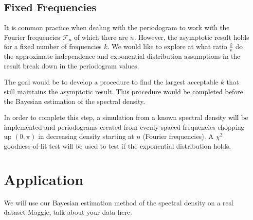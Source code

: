 \documentclass{article}\usepackage[]{graphicx}\usepackage[]{color}
\newcommand{\ak}[1]{{\color{magenta} #1}}
\newcommand{\mj}[1]{{\color{blue} #1}}
\theoremstyle{plain}
\begin{document}
\subsection*{Fixed Frequencies}
It is common practice when dealing with the periodogram to work with the Fourier frequencies $\mathcal{F}_n$ of which there are $n$. However, the asymptotic result \mj{holds for} a fixed number of frequencies $k$. We would like to explore at what ratio $\frac{k}{n}$ do the approximate independence and exponential distribution \mj{assumptions in the result} break down in the periodogram values.

The goal would be to develop a procedure to find the largest acceptable $k$ that still maintains \mj{the asymptotic result}. This procedure would be completed before the Bayesian estimation of the spectral density.

In order to complete this step, a simulation from a known spectral density will be implemented and periodograms created from evenly spaced frequencies chopping up $(0,\pi)$ in decreasing density starting at $n$ (Fourier frequencies). A $\chi^2$ goodness-of-fit test will be used to test if the exponential distribution holds. 

\section*{Application}
We will use our Bayesian estimation method of the spectral density on a real dataset \ak{Maggie, talk about your data here}.

\printbibliography
\end{document}
